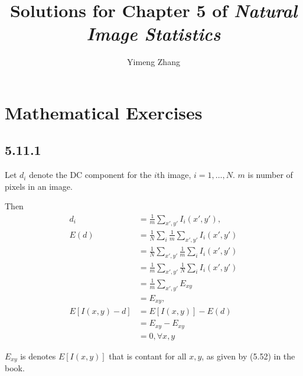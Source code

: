 \documentclass[12pt]{article}
\title{Solutions for Chapter 5 of \emph{Natural Image Statistics}}
\author{Yimeng Zhang}
\begin{document}
\maketitle





\section{Mathematical Exercises} %
\label{sec:mathematical_exercises}

\subsection*{5.11.1} %
\label{sub:5_11_1}

Let $d_i$ denote the DC component for the $i$th image, $i=1,\ldots,N$. $m$ is number of pixels in an image.

Then 
\begin{align}
d_i & =  \frac{1}{m} \sum_{x',y'} I_i(x',y'), \\
E(d) & = \frac{1}{N} \sum_i \frac{1}{m} \sum_{x',y'} I_i(x',y') \\
     & =  \frac{1}{N} \sum_{x',y'}  \frac{1}{m} \sum_i I_i(x',y') \\
     & =  \frac{1}{m} \sum_{x',y'}  \frac{1}{N} \sum_i I_i(x',y') \\
     & =  \frac{1}{m} \sum_{x',y'}  E_{xy} \\
     &=  E_{xy},\\
E[I(x,y) - d] & = E[I(x,y)] - E(d) \\
              & = E_{xy} - E_{xy}\\
              & = 0, \forall x,y
\end{align}

$E_{xy}$ is denotes $E[I(x,y)]$ that is contant for all $x,y$, as given by (5.52) in the book.
\end{document}
